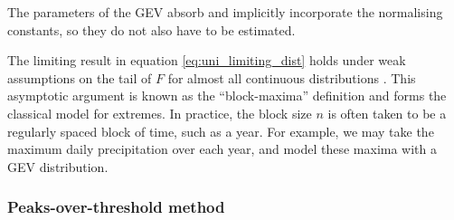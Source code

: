 \documentclass{article}
\numberwithin{equation}{section}
\begin{document}
The parameters of the GEV absorb and implicitly incorporate the normalising constants, so they do not also have to be estimated. 

The limiting result in equation \eqref{eq:uni_limiting_dist} holds under weak assumptions on the tail of $F$ for almost all continuous distributions \citep{Dupuis2023}. 
This asymptotic argument is known as the ``block-maxima'' definition and forms the classical model for extremes. 
In practice, the block size $n$ is often taken to be a regularly spaced block of time, such as a year. %
For example, we may take the maximum daily precipitation over each year, and model these maxima with a GEV distribution.

\subsubsection{Peaks-over-threshold method} \label{subsubsec:pot}
\end{document}
